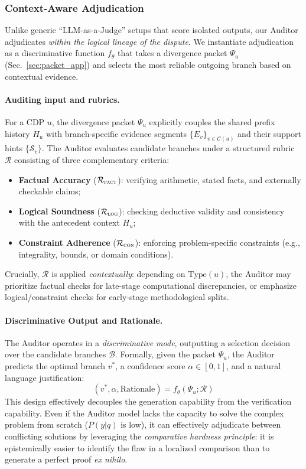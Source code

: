 \documentclass{article}
\theoremstyle{plain}
\theoremstyle{definition}
\theoremstyle{remark}
\begin{document}
\subsubsection{Context-Aware Adjudication}
\label{sec:adjudication_app}

Unlike generic ``LLM-as-a-Judge'' setups that score isolated outputs, our Auditor adjudicates \emph{within the logical lineage of the dispute}. We instantiate adjudication as a discriminative function $f_{\theta}$ that takes a divergence packet $\Psi_u$ (Sec.~\ref{sec:packet_app}) and selects the most reliable outgoing branch based on contextual evidence.

\paragraph{Auditing input and rubrics.}
For a CDP $u$, the divergence packet $\Psi_u$ explicitly couples the shared prefix history $H_u$ with branch-specific evidence segments $\{E_v\}_{v\in\mathcal{C}(u)}$ and their support hints $\{\mathcal{S}_v\}$. The Auditor evaluates candidate branches under a structured rubric $\mathcal{R}$ consisting of three complementary criteria:
\begin{itemize}
    \item \textbf{Factual Accuracy} ($\mathcal{R}_{\textsc{fact}}$): verifying arithmetic, stated facts, and externally checkable claims;
    \item \textbf{Logical Soundness} ($\mathcal{R}_{\textsc{log}}$): checking deductive validity and consistency with the antecedent context $H_u$;
    \item \textbf{Constraint Adherence} ($\mathcal{R}_{\textsc{con}}$): enforcing problem-specific constraints (e.g., integrality, bounds, or domain conditions).
\end{itemize}
Crucially, $\mathcal{R}$ is applied \emph{contextually}: depending on $\text{Type}(u)$, the Auditor may prioritize factual checks for late-stage computational discrepancies, or emphasize logical/constraint checks for early-stage methodological splits.

\paragraph{Discriminative Output and Rationale.}
The Auditor operates in a \textit{discriminative mode}, outputting a selection decision over the candidate branches $\mathcal{B}$. Formally, given the packet $\Psi_u$, the Auditor predicts the optimal branch $v^*$, a confidence score $\alpha \in [0,1]$, and a natural language justification:
\begin{equation}
    (v^*, \alpha, \text{Rationale}) = f_{\theta}(\Psi_u; \mathcal{R})
\end{equation}
This design effectively decouples the generation capability from the verification capability. Even if the Auditor model lacks the capacity to solve the complex problem from scratch ($P(y|q)$ is low), it can effectively adjudicate between conflicting solutions by leveraging the \textit{comparative hardness principle}: it is epistemically easier to identify the flaw in a localized comparison than to generate a perfect proof \textit{ex nihilo}.
\end{document}
